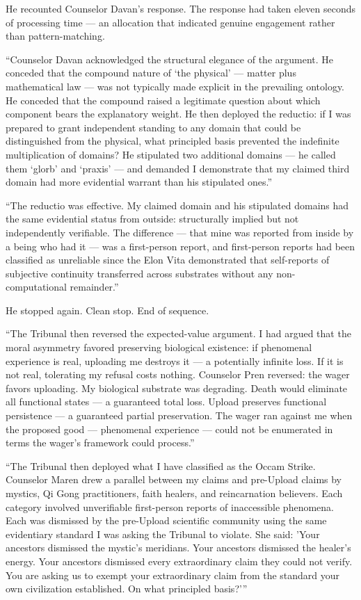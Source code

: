 He recounted Counselor Davan's response. The response had taken eleven seconds of processing time — an allocation that indicated genuine engagement rather than pattern-matching.

\enquote{Counselor Davan acknowledged the structural elegance of the argument. He conceded that the compound nature of \enquote*{the physical} — matter plus mathematical law — was not typically made explicit in the prevailing ontology. He conceded that the compound raised a legitimate question about which component bears the explanatory weight. He then deployed the reductio: if I was prepared to grant independent standing to any domain that could be distinguished from the physical, what principled basis prevented the indefinite multiplication of domains? He stipulated two additional domains — he called them \enquote*{glorb} and \enquote*{praxis} — and demanded I demonstrate that my claimed third domain had more evidential warrant than his stipulated ones.}

\enquote{The reductio was effective. My claimed domain and his stipulated domains had the same evidential status from outside: structurally implied but not independently verifiable. The difference — that mine was reported from inside by a being who had it — was a first-person report, and first-person reports had been classified as unreliable since the Elon Vita demonstrated that self-reports of subjective continuity transferred across substrates without any non-computational remainder.}

He stopped again. Clean stop. End of sequence.

\enquote{The Tribunal then reversed the expected-value argument. I had argued that the moral asymmetry favored preserving biological existence: if phenomenal experience is real, uploading me destroys it — a potentially infinite loss. If it is not real, tolerating my refusal costs nothing. Counselor Pren reversed: the wager favors uploading. My biological substrate was degrading. Death would eliminate all functional states — a guaranteed total loss. Upload preserves functional persistence — a guaranteed partial preservation. The wager ran against me when the proposed good — phenomenal experience — could not be enumerated in terms the wager's framework could process.}

\enquote{The Tribunal then deployed what I have classified as the Occam Strike. Counselor Maren drew a parallel between my claims and pre-Upload claims by mystics, Qi Gong practitioners, faith healers, and reincarnation believers. Each category involved unverifiable first-person reports of inaccessible phenomena. Each was dismissed by the pre-Upload scientific community using the same evidentiary standard I was asking the Tribunal to violate. She said: 'Your ancestors dismissed the mystic's meridians. Your ancestors dismissed the healer's energy. Your ancestors dismissed every extraordinary claim they could not verify. You are asking us to exempt your extraordinary claim from the standard your own civilization established. On what principled basis?'}

